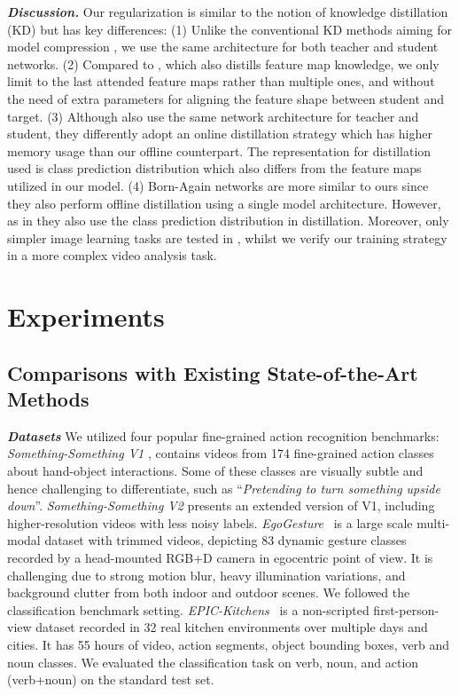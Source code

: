 \documentclass[runningheads]{llncs}
\newcommand{\keypoint}[1]{\vspace{0.1cm}\noindent\textbf{#1}\quad}
\begin{document}
\textbf{\em Discussion. }
Our regularization is similar to the notion of knowledge distillation (KD) \cite{furlanello2018born,hinton2015distilling,lan2018knowledge,romero2014fitnets,zhang2018deep} but has key differences:
(1) Unlike the conventional KD methods aiming for 
model compression \cite{hinton2015distilling,romero2014fitnets}, we use the same architecture for 
both teacher and student networks.
(2) Compared to \cite{romero2014fitnets}, which also distills feature map knowledge, we only limit to the last attended feature maps rather than multiple ones, and without the need of extra parameters for aligning the feature shape between student and target.
(3) Although \cite{lan2018knowledge,zhang2018deep}
also use the same network architecture for teacher and student, they differently adopt an online distillation strategy which has higher memory usage than our offline counterpart. The representation for distillation used is class prediction distribution which also differs from the feature maps utilized in our model.
(4) Born-Again networks \cite{furlanello2018born}
are more similar to ours since they also perform offline distillation using a single model architecture.
However, as in \cite{lan2018knowledge,zhang2018deep} they also use the class prediction distribution in distillation.
Moreover, only simpler image learning tasks are tested in \cite{furlanello2018born}, whilst we verify our training strategy in a more complex video analysis task.



\section{Experiments}
\label{sec:experiments}

\subsection{Comparisons with Existing State-of-the-Art Methods}

\keypoint{\em Datasets}
We utilized four popular fine-grained action recognition
benchmarks:
{\em Something-Something V1} \cite{goyal2017something}, 
contains  videos
from 174 fine-grained action classes 
about hand-object interactions. Some of these classes 
are visually subtle and hence challenging to differentiate, 
such as ``{\em Pretending to turn something upside down}''. 
{\em Something-Something V2} \cite{mahdisoltani2018fine} presents an extended version of V1,
including  higher-resolution videos 
with less noisy labels.
{\em EgoGesture}~\cite{zhang2018egogesture} is a 
large scale multi-modal dataset with  trimmed videos, 
depicting 83 dynamic gesture classes recorded 
by a head-mounted RGB+D camera in egocentric point of view.
It is challenging due to strong motion blur, heavy
illumination variations, and background clutter
from both indoor and outdoor scenes.
We followed the classification benchmark setting.
{\em EPIC-Kitchens}~\cite{damen2018scaling} is a non-scripted
first-person-view dataset
recorded in 32 real kitchen
environments over multiple days and cities.
It has 55 hours of video,  action
segments,  object bounding boxes, 
 verb and  noun classes.
We evaluated the classification task 
on verb, noun, and action (verb+noun)
on the standard test set.
\end{document}
